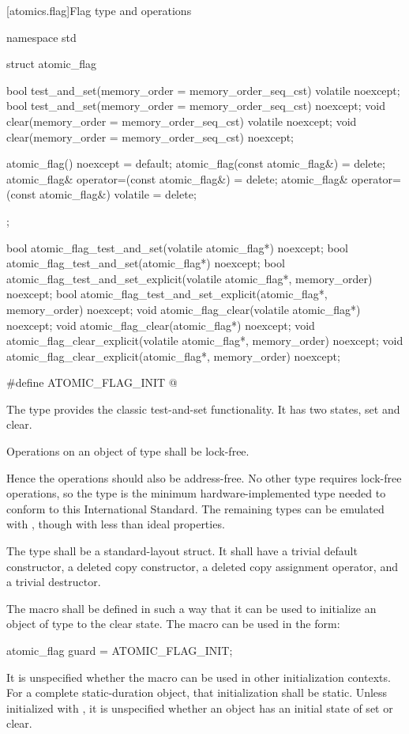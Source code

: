 [atomics.flag]{Flag type and operations}

\begin{codeblock}
namespace std {
  struct atomic_flag {
    bool test_and_set(memory_order = memory_order_seq_cst) volatile noexcept;
    bool test_and_set(memory_order = memory_order_seq_cst) noexcept;
    void clear(memory_order = memory_order_seq_cst) volatile noexcept;
    void clear(memory_order = memory_order_seq_cst) noexcept;

    atomic_flag() noexcept = default;
    atomic_flag(const atomic_flag&) = delete;
    atomic_flag& operator=(const atomic_flag&) = delete;
    atomic_flag& operator=(const atomic_flag&) volatile = delete;
  };

  bool atomic_flag_test_and_set(volatile atomic_flag*) noexcept;
  bool atomic_flag_test_and_set(atomic_flag*) noexcept;
  bool atomic_flag_test_and_set_explicit(volatile atomic_flag*, memory_order) noexcept;
  bool atomic_flag_test_and_set_explicit(atomic_flag*, memory_order) noexcept;
  void atomic_flag_clear(volatile atomic_flag*) noexcept;
  void atomic_flag_clear(atomic_flag*) noexcept;
  void atomic_flag_clear_explicit(volatile atomic_flag*, memory_order) noexcept;
  void atomic_flag_clear_explicit(atomic_flag*, memory_order) noexcept;

  #define ATOMIC_FLAG_INIT @\seebelow@
}
\end{codeblock}

\pnum
The  type provides the classic test-and-set functionality. It has two states, set and clear.

\pnum
Operations on an object of type  shall be lock-free. \begin{note} Hence
the operations should also be address-free. No other type requires lock-free operations,
so the  type is the minimum hardware-implemented type needed to
conform to this International Standard. The remaining types can be emulated with
, though with less than ideal properties. \end{note}

\pnum
The  type shall be a standard-layout struct.
It shall have a trivial default constructor, a deleted copy constructor, a deleted copy assignment operator, and a trivial destructor.

\pnum
The macro  shall be defined in such a way that it can be used to initialize an object of type  to the
clear state. The macro can be used in the form:
\begin{codeblock}
atomic_flag guard = ATOMIC_FLAG_INIT;
\end{codeblock}
It is unspecified whether the macro can be used in other initialization contexts.
For a complete static-duration object, that initialization shall be static.
Unless initialized with , it is unspecified whether an
 object has an initial state of set or clear.

